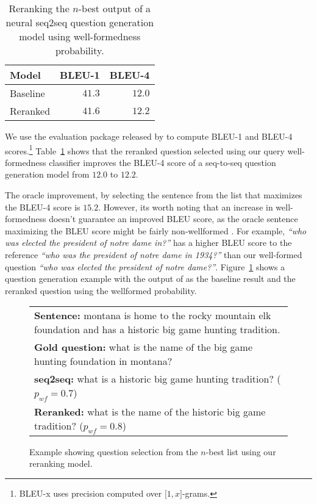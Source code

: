 \documentclass[11pt,a4paper]{article}
\newcommand{\ignore}[1]{}
\begin{document}
\begin{table}[!tb]
  \centering
  \begin{tabular}{|lrr|}
  \hline
  Model & BLEU-1 & BLEU-4\\
  \hline
  Baseline & $41.3$ & $12.0$ \\
  Reranked & $\mathbf{41.6}$ & $\mathbf{12.2}$ \\
  \hline
  \end{tabular}
  \caption{Reranking the $n$-best output of a neural seq2seq question generation model using well-formedness probability.}
  \label{tab:rerank}
\end{table}

We use the evaluation package released by  to compute
BLEU-1 and BLEU-4 scores.\footnote{BLEU-x uses precision computed over $\lbrack1, x\rbrack$-grams.} Table~\ref{tab:rerank} shows that the reranked question
selected using our query well-formedness classifier improves the BLEU-4 score of a
seq-to-seq question generation model from $12.0$ to $12.2$.
\ignore{Out of the $12$k questions in the test set, our model helped select a better
question  $449$ times which corresponds to $3.75\%$ of the total test set.}
The oracle improvement, by selecting the sentence from the list that maximizes
the BLEU-4 score is $15.2$.
However, its worth noting that an increase in well-formedness doesn't guarantee an improved
BLEU score, as the oracle sentence maximizing the BLEU score might be fairly non-wellformed
\cite{badbleu}. For example, \textit{``who was elected the president of notre dame in?''}
has a higher BLEU score to the reference \textit{``who was the president of notre dame in 1934?''}
than our well-formed question \textit{``who was elected the president of notre dame?''}.
Figure~\ref{fig:rerankexample}
shows a question generation example with the output of  
as the baseline result and the reranked question using the wellformed probability.


\begin{figure}[!tb]
\centering
\begin{tabular}{|p{7cm}|}
\hline
\textbf{Sentence:} montana is home to the rocky mountain elk foundation and has a historic big game hunting tradition.\\
\textbf{Gold question:} what is the name of the big game hunting foundation in montana?\\
\hline
\textbf{seq2seq:} what is a historic big game hunting tradition? ($p_{wf}=0.7$)\\
\textbf{Reranked:} what is the name of the historic big game tradition? ($p_{wf}=0.8$)\\
\hline
\end{tabular}
\label{fig:rerankexample}
\caption{Example showing question selection from the $n$-best list using our reranking model.}
\end{figure}
\end{document}

